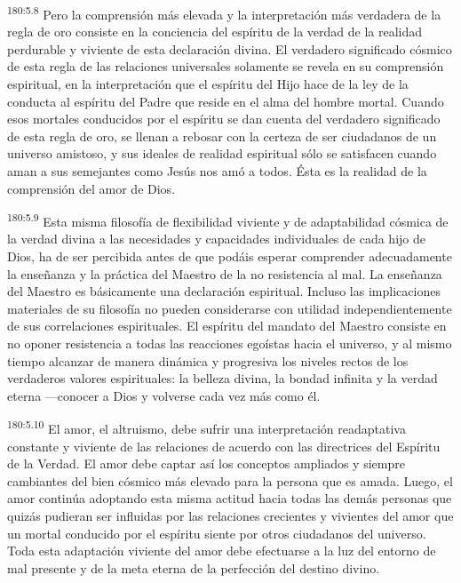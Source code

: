 \par 
\textsuperscript{180:5.8} Pero la comprensión más elevada y la interpretación más verdadera de la regla de oro consiste en la conciencia del espíritu de la verdad de la realidad perdurable y viviente de esta declaración divina. El verdadero significado cósmico de esta regla de las relaciones universales solamente se revela en su comprensión espiritual, en la interpretación que el espíritu del Hijo hace de la ley de la conducta al espíritu del Padre que reside en el alma del hombre mortal. Cuando esos mortales conducidos por el espíritu se dan cuenta del verdadero significado de esta regla de oro, se llenan a rebosar con la certeza de ser ciudadanos de un universo amistoso, y sus ideales de realidad espiritual sólo se satisfacen cuando aman a sus semejantes como Jesús nos amó a todos. Ésta es la realidad de la comprensión del amor de Dios.

\par 
\textsuperscript{180:5.9} Esta misma filosofía de flexibilidad viviente y de adaptabilidad cósmica de la verdad divina a las necesidades y capacidades individuales de cada hijo de Dios, ha de ser percibida antes de que podáis esperar comprender adecuadamente la enseñanza y la práctica del Maestro de la no resistencia al mal. La enseñanza del Maestro es básicamente una declaración espiritual. Incluso las implicaciones materiales de su filosofía no pueden considerarse con utilidad independientemente de sus correlaciones espirituales. El espíritu del mandato del Maestro consiste en no oponer resistencia a todas las reacciones egoístas hacia el universo, y al mismo tiempo alcanzar de manera dinámica y progresiva los niveles rectos de los verdaderos valores espirituales: la belleza divina, la bondad infinita y la verdad eterna ---conocer a Dios y volverse cada vez más como él.

\par 
\textsuperscript{180:5.10} El amor, el altruismo, debe sufrir una interpretación readaptativa constante y viviente de las relaciones de acuerdo con las directrices del Espíritu de la Verdad. El amor debe captar así los conceptos ampliados y siempre cambiantes del bien cósmico más elevado para la persona que es amada. Luego, el amor continúa adoptando esta misma actitud hacia todas las demás personas que quizás pudieran ser influidas por las relaciones crecientes y vivientes del amor que un mortal conducido por el espíritu siente por otros ciudadanos del universo. Toda esta adaptación viviente del amor debe efectuarse a la luz del entorno de mal presente y de la meta eterna de la perfección del destino divino.

